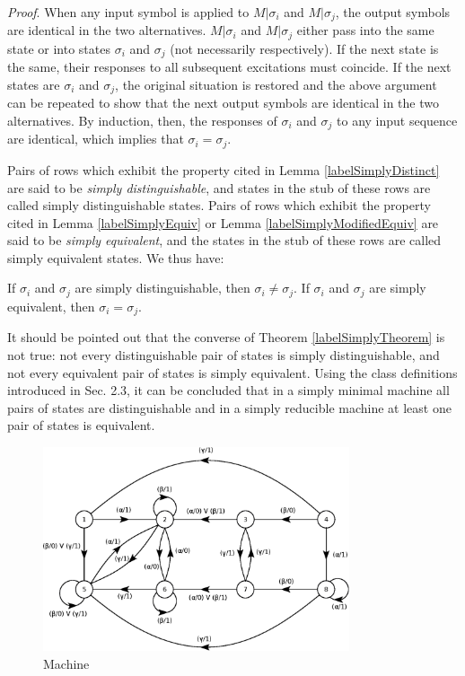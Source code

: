 \documentclass[a4paper]{report}
\begin{document}
    \emph{Proof}. When any input symbol is applied to $M|\sigma_i$ and $M|\sigma_j$, the output symbols are identical in the two alternatives. $M|\sigma_i$ and $M|\sigma_j$ either pass into the same state or into states $\sigma_i$ and $\sigma_j$ (not necessarily respectively). If the next state is the same, their responses to all subsequent excitations must coincide. If the next states are $\sigma_i$ and $\sigma_j$, the original situation is restored and the above argument can be repeated to show that the next output symbols are identical in the two alternatives. By induction, then, the responses of $\sigma_i$ and $\sigma_j$ to any input sequence are identical, which implies that $\sigma_i = \sigma_j$.

    Pairs of rows which exhibit the property cited in Lemma \ref{labelSimplyDistinct} are said to be \emph{simply distinguishable}, and states in the stub of these rows are called simply distinguishable states. Pairs of rows which exhibit the property cited in Lemma \ref{labelSimplyEquiv} or Lemma \ref{labelSimplyModifiedEquiv} are said to be \emph{simply equivalent}, and the states in the stub of these rows are called simply equivalent states.
    We thus have:

    \theorem \label{labelSimplyTheorem} If $\sigma_i$ and $\sigma_j$ are simply distinguishable, then $\sigma_i \neq \sigma_j $. If $\sigma_i$ and $\sigma_j$ are simply equivalent, then $\sigma_i = \sigma_j $.

    It should be pointed out that the converse of Theorem \ref{labelSimplyTheorem} is not true: not every distinguishable pair of states is simply distinguishable, and not every equivalent pair of states is simply equivalent. Using the class definitions introduced in Sec. 2.3, it can be concluded that in a simply minimal machine all pairs of states are distinguishable and in a simply reducible machine at least one pair of states is equivalent.

    \incSampleMachine
    \label{labelMachine6}
    \begin{figure}[!t]
        \centering
        \includegraphics[width=256pt,clip]{images/eps/machineA6}
        \caption{Machine \sampleMachine}
        \label{fig:machineA6}
    \end{figure}
\end{document}
